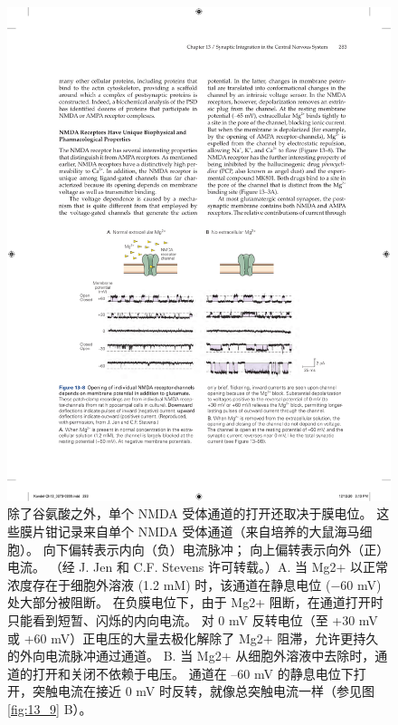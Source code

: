 \begin{figure}[htbp]
	\centering
	\includegraphics[width=0.8\linewidth]{chap13/fig_13_8}
	\caption{除了谷氨酸之外，单个 NMDA 受体通道的打开还取决于膜电位。 这些膜片钳记录来自单个 NMDA 受体通道（来自培养的大鼠海马细胞）。 向下偏转表示内向（负）电流脉冲； 向上偏转表示向外（正）电流。 （经 J. Jen 和 C.F. Stevens 许可转载。）A. 当 Mg2+ 以正常浓度存在于细胞外溶液 (1.2 mM) 时，该通道在静息电位 (−60 mV) 处大部分被阻断。 在负膜电位下，由于 Mg2+ 阻断，在通道打开时只能看到短暂、闪烁的内向电流。 对 0 mV 反转电位（至 +30 mV 或 +60 mV）正电压的大量去极化解除了 Mg2+ 阻滞，允许更持久的外向电流脉冲通过通道。 B. 当 Mg2+ 从细胞外溶液中去除时，通道的打开和关闭不依赖于电压。 通道在 –60 mV 的静息电位下打开，突触电流在接近 0 mV 时反转，就像总突触电流一样（参见图 \ref{fig:13_9} B）。}
	\label{fig:13_8}
\end{figure}

